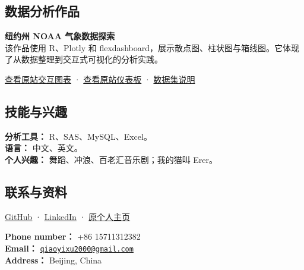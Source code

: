 \documentclass[
  10pt,
  UTF8,
  fontset=fandol]{ctexart}
\begin{document}
\subsection{数据分析作品}\label{projects}

\textbf{纽约州 NOAA 气象数据探索}\\
该作品使用 R、Plotly 和
flexdashboard，展示散点图、柱状图与箱线图。它体现了从数据整理到交互式可视化的分析实践。

\href{https://qiaoyixu.github.io/plotly.html}{查看原站交互图表} ·
\href{https://qiaoyixu.github.io/dashboard.html}{查看原站仪表板} ·
\href{https://p8105.com/dataset_noaa.html}{数据集说明}

\subsection{技能与兴趣}\label{skills}

\textbf{分析工具：} R、SAS、MySQL、Excel。\\
\textbf{语言：} 中文、英文。\\
\textbf{个人兴趣：} 舞蹈、冲浪、百老汇音乐剧；我的猫叫 Erer。

\subsection{联系与资料}\label{contact}

\href{https://github.com/joycexu2000-web}{GitHub} ·
\href{https://www.linkedin.com/in/qiaoyi-xu-99b8091b9/}{LinkedIn} ·
\href{https://qiaoyixu.github.io/}{原个人主页}

\textbf{Phone number：} +86 15711312382\\
\textbf{Email：}
\href{mailto:qiaoyixu2000@gmail.com}{\nolinkurl{qiaoyixu2000@gmail.com}}\\
\textbf{Address：} Beijing, China
\end{document}
